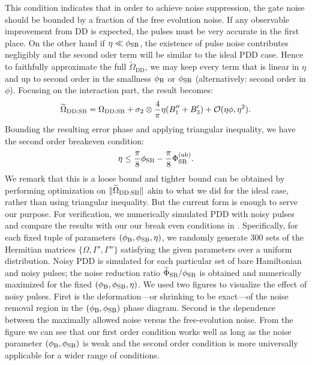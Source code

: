 \documentclass[pra,reprint,superscriptaddress]{revtex4-2}
\newcommand{\wt}[1]{\widetilde{#1}}
\newcommand{\rDD}{\mathrm{DD}}
\begin{document}
This condition indicates that in order to achieve noise suppression, the gate noise should be bounded by a fraction of the free evolution noise. If any observable improvement from DD is expected, the pulses must be very accurate in the first place.   On the other hand if $\eta\ll \phi_{\mathrm{SB}}$, the existence of pulse noise contributes negligibly and the second oder term will be similar to the ideal PDD case. Hence to faithfully approximate the full $\wt\Omega_\rDD$, we may keep every term that is linear in $\eta$ and up to second order in the smallness $\phi_{\mathrm{B}}$ or $\phi_{\mathrm{SB}}$ (alternatively: second order in $\phi$). Focusing on the interaction part, the result becomes:
\begin{equation}
 \wt\Omega_{\rDD:\rSB} = \Omega_{\rDD:\rSB} +\sigma_2 \otimes \frac{4}{\pi}\eta(B_1''+B_3') + \cO(\eta\phi,\eta^2).
\end{equation}
Bounding the resulting error phase and applying triangular inequality, we have the second order breakeven condition:
\begin{equation}\label{eq:npulses-breakeven2}
   \eta \le \frac{\pi}{8} \phi_{\mathrm{SB}} - \frac{\pi}{8}\Phi_{\mathrm{SB}}^{(\mathrm{ub})}.
\end{equation}
We remark that this is a loose bound and tighter bound can be obtained by performing optimization on $\norm{\wt\Omega_{\rDD:\rSB}}$ akin to what we did for the ideal case, rather than using triangular inequality. But the current form is enough to serve our purpose. 
For verification, we numerically simulated PDD with noisy pulses and compare the results with our our break even conditions in . 
Specifically, for each fixed tuple of parameters $(\phi_{\mathrm{B}},\phi_{\mathrm{SB}},\eta)$, we randomly generate 300 sets of the Hermitian matrices $\{\Omega,\Gamma',\Gamma''\}$
satisfying the given parameters over a uniform distribution. Noisy PDD is simulated for each particular set of  bare Hamiltonian and noisy pulses; the noise reduction ratio $\wt\Phi_\rSB/\phi_\rSB$ is obtained and numerically maximized for the fixed $(\phi_{\mathrm{B}},\phi_{\mathrm{SB}},\eta)$. 
We used two figures to visualize the effect of noisy pulses. First is the deformation---or shrinking to be exact---of the noise removal region in the $(\phi_{\mathrm{B}},\phi_{\mathrm{SB}})$ phase diagram. Second is the dependence between the maximally allowed noise versus the free-evolution noise. From the figure we can see that our first order condition works well as long as the noise parameter $(\phi_{\mathrm{B}},\phi_{\mathrm{SB}})$ is weak and the second order condition is more universally applicable for a wider range of conditions.
\end{document}
